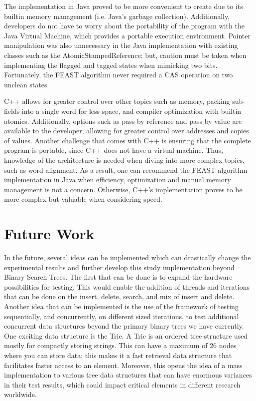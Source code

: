\documentclass[conference]{IEEEtran}
\begin{document}
The implementation in Java proved to be more convenient to create due to its builtin memory management (i.e. Java's garbage collection). Additionally, developers do not have to worry about the portability of the program with the Java Virtual Machine, which provides a portable execution environment. Pointer manipulation was also unnecessary in the Java implementation with existing classes such as the AtomicStampedReference; but, caution must be taken when implementing the flagged and tagged states when mimicking two bits. Fortunately, the FEAST algorithm never required a CAS operation on two unclean states. 

C++ allows for greater control over other topics such as memory, packing sub-fields into a single word for less space, and compiler optimization with builtin atomics. Additionally, options such as pass by reference and pass by value are available to the developer, allowing for greater control over addresses and copies of values. Another challenge that comes with C++ is ensuring that the complete program is portable, since C++ does not have a virtual machine. Thus, knowledge of the architecture is needed when diving into more complex topics, such as word alignment. As a result, one can recommend the FEAST algorithm implementation in Java when efficiency, optimization and manual memory management is not a concern. Otherwise, C++'s implementation proves to be more complex but valuable when considering speed.

\section{Future Work}
In the future, several ideas can be implemented which can drastically change the experimental results and further develop this study implementation beyond Binary Search Trees. The first that can be done is to expand the hardware possibilities for testing. This would enable the addition of threads and iterations that can be done on the insert, delete, search, and mix of insert and delete. Another idea that can be implemented is the use of the framework of testing sequentially, and concurrently, on different sized iterations, to test additional concurrent data structures beyond the primary binary trees we have currently. One exciting data structure is the Trie. A Trie is an ordered tree structure used mostly for compactly storing strings. This can have a maximum of 26 nodes where you can store data; this makes it a fast retrieval data structure that facilitates faster access to an element. Moreover, this opens the idea of a mass implementation to various tree data structures that can have enormous variances in their test results, which could impact critical elements in different research worldwide.
\end{document}
